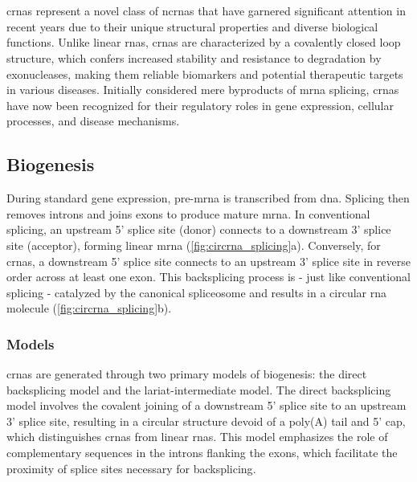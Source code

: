 \section{}
\label{sec:circrnas}

\Glspl{crna} represent a novel class of \glspl{ncrna} that have garnered
significant attention in recent years due to their unique structural properties
and diverse biological functions.
Unlike linear \glspl{rna}, \glspl{crna} are characterized by a covalently
closed loop structure, which confers increased stability and resistance to
degradation by exonucleases, making them reliable biomarkers and potential
therapeutic targets in various
diseases\supercite{ma_circular_2020,hoque_exploring_2023,wilusz_circular_2017}.
Initially considered mere byproducts of \gls{mrna} splicing, \glspl{crna} have
now been recognized for their regulatory roles in gene expression, cellular
processes, and disease
mechanisms\supercite{cherubini_foxp1_2019,wilusz_360_2018}.

\subsection{Biogenesis}
\label{sec:circrna_biogenesis}
During standard gene expression, pre-\gls{mrna} is transcribed from \gls{dna}.
Splicing then removes introns and joins exons to produce mature
\gls{mrna}\supercite{black_mechanisms_2003}.
In conventional splicing, an upstream 5' splice site (donor) connects to a
downstream 3' splice site (acceptor), forming linear \gls{mrna}
(\cref{fig:circrna_splicing}a).
Conversely, for \glspl{crna}, a downstream 5' splice site connects to an
upstream 3' splice site in reverse order across at least one
exon\supercite{chen_expanding_2020}.
This backsplicing process is - just like conventional splicing - catalyzed by
the canonical spliceosome\supercite{starke_exon_2015} and results in a circular
\gls{rna} molecule (\cref{fig:circrna_splicing}b).

\subsubsection{Models}

\glspl{crna} are generated through two primary models of
biogenesis: the direct backsplicing model and the lariat-intermediate model.
The direct backsplicing model involves the covalent joining of a downstream 5'
splice site to an upstream 3' splice site, resulting in a circular structure
devoid of a poly(A) tail and 5' cap, which distinguishes \glspl{crna} from
linear \glspl{rna}\supercite{zhang_complementary_2014,ferreira_circular_2018}.
This model emphasizes the role of complementary sequences in the introns
flanking the exons, which facilitate the proximity of splice sites necessary
for backsplicing\supercite{zhang_complementary_2014,meganck_engineering_2021}.

